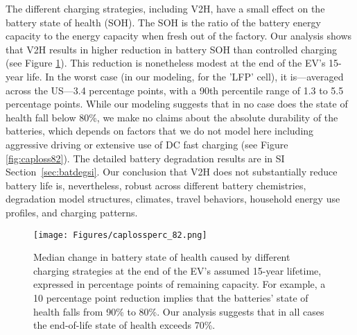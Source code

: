 \documentclass[11pt,preprint]{elsarticle}
\begin{document}
The different charging strategies, including V2H, have a small effect on the battery state of health (SOH). The SOH is the ratio of the battery energy capacity to the energy capacity when fresh out of the factory. Our analysis shows that V2H results in higher reduction in battery SOH than controlled charging (see Figure \ref{fig:caploss82perc}). This reduction is nonetheless modest at the end of the EV's 15-year life. In the worst case (in our modeling, for the 'LFP' cell), it is—averaged across the US—3.4 percentage points, with a 90th percentile range of 1.3 to 5.5 percentage points. While our modeling suggests that in no case does the state of health fall below 80\%, we make no claims about the absolute durability of the batteries, which depends on factors that we do not model here including aggressive driving or extensive use of DC fast charging (see Figure \ref{fig:caploss82}). The detailed battery degradation results are in SI Section~\ref{sec:batdegsi}. Our conclusion that V2H does not substantially reduce battery life is, nevertheless, robust across different battery chemistries, degradation model structures, climates, travel behaviors, household energy use profiles, and charging patterns. 

\begin{figure}[H]
    \centering
    \texttt{[image: Figures/caplossperc\_82.png]}
    \caption{Median change in battery state of health caused by different charging strategies at the end of the EV's assumed 15-year lifetime, expressed in percentage points of remaining capacity. For example, a 10 percentage point reduction implies that the batteries' state of health falls from 90\% to 80\%. Our analysis suggests that in all cases the end-of-life state of health exceeds 70\%.}
    \label{fig:caploss82perc}
\end{figure}
\end{document}
